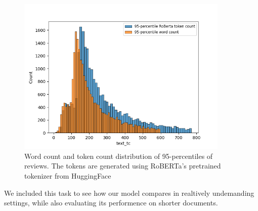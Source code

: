 \begin{figure}[ht]
  \centering
  \includegraphics[width=0.9\textwidth]{img/imdb_word_token_distributions.png}
  \caption{Word count and token count distribution of 95-percentiles of
  reviews. The tokens are generated using RoBERTa's pretrained tokenizer from
  HuggingFace}\label{fig:imdb_word_token_dist}
\end{figure}

We included this task to see how our model compares in realtively undemanding
settings, while also evaluating its performence on shorter documents.

